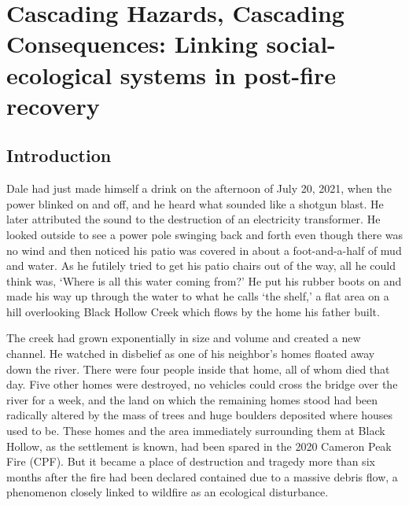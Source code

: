 \documentclass[
]{article}
\begin{document}
\clearpage

\section{Cascading Hazards, Cascading Consequences: Linking social-ecological systems in post-fire recovery}\label{cascading-hazards-cascading-consequences-linking-social-ecological-systems-in-post-fire-recovery}

\renewcommand{\thefigure}{2.\arabic{figure}}
\setcounter{figure}{0}
\renewcommand{\thetable}{2.\arabic{table}}
\setcounter{table}{0}
\renewcommand{\theequation}{2.\arabic{equation}}
\setcounter{equation}{0}

\subsection{Introduction}\label{introduction-1}

Dale had just made himself a drink on the afternoon of July 20, 2021, when the power blinked on and off, and he heard what sounded like a shotgun blast. He later attributed the sound to the destruction of an electricity transformer. He looked outside to see a power pole swinging back and forth even though there was no wind and then noticed his patio was covered in about a foot-and-a-half of mud and water. As he futilely tried to get his patio chairs out of the way, all he could think was, `Where is all this water coming from?' He put his rubber boots on and made his way up through the water to what he calls `the shelf,' a flat area on a hill overlooking Black Hollow Creek which flows by the home his father built.

The creek had grown exponentially in size and volume and created a new channel. He watched in disbelief as one of his neighbor's homes floated away down the river. There were four people inside that home, all of whom died that day. Five other homes were destroyed, no vehicles could cross the bridge over the river for a week, and the land on which the remaining homes stood had been radically altered by the mass of trees and huge boulders deposited where houses used to be. These homes and the area immediately surrounding them at Black Hollow, as the settlement is known, had been spared in the 2020 Cameron Peak Fire (CPF). But it became a place of destruction and tragedy more than six months after the fire had been declared contained due to a massive debris flow, a phenomenon closely linked to wildfire as an ecological disturbance.
\end{document}
